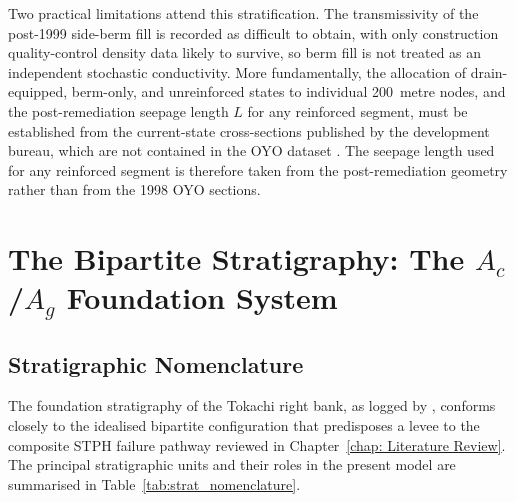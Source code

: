 Two practical limitations attend this stratification. The transmissivity of the post-1999 side-berm fill is recorded as difficult to obtain, with only construction quality-control density data likely to survive, so berm fill is not treated as an independent stochastic conductivity. More fundamentally, the allocation of drain-equipped, berm-only, and unreinforced states to individual 200~metre nodes, and the post-remediation seepage length $L$ for any reinforced segment, must be established from the current-state cross-sections published by the development bureau, which are not contained in the OYO dataset \parencite{fukuda_2025_internal}. The seepage length used for any reinforced segment is therefore taken from the post-remediation geometry rather than from the 1998 OYO sections.


\section{The Bipartite Stratigraphy: The \texorpdfstring{$A_c$/$A_g$}{Ac/Ag} Foundation System}
\label{sec: The Bipartite Stratigraphy: The Ac/Ag Foundation System}

\subsection{Stratigraphic Nomenclature}
\label{subsec: Stratigraphic Nomenclature}

The foundation stratigraphy of the Tokachi right bank, as logged by \textcite{oyo_1999}, conforms closely to the idealised bipartite configuration that predisposes a levee to the composite STPH failure pathway reviewed in Chapter~\ref{chap: Literature Review}. The principal stratigraphic units and their roles in the present model are summarised in Table~\ref{tab:strat_nomenclature}.


